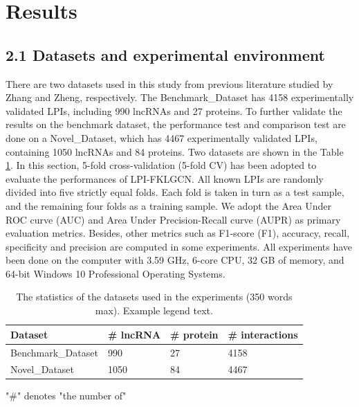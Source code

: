 \documentclass[fleqn,10pt]{wlscirep}
\begin{document}
\section*{Results}
\subsection*{2.1 Datasets and experimental environment}
There are two datasets used in this study from previous literature studied by Zhang\cite{Zhang2018} and Zheng\cite{Zheng2017a}, respectively. The Benchmark\_Dataset has 4158 experimentally validated LPIs, including 990 lncRNAs and 27 proteins. To further validate the results on the benchmark dataset, the performance test and comparison test are done on a Novel\_Dataset, which has 4467 experimentally validated LPIs, containing 1050 lncRNAs and 84 proteins. Two datasets are shown in the Table \ref{tab:datasets}. In this section, 5-fold cross-validation (5-fold CV) has been adopted to evaluate the performances of LPI-FKLGCN. All known LPIs are randomly divided into five strictly equal folds. Each fold is taken in turn as a test sample, and the remaining four folds as a training sample. We adopt the Area Under ROC curve (AUC) and Area Under Precision-Recall curve (AUPR)  as primary evaluation metrics. Besides, other metrics such as F1-score (F1), accuracy, recall, specificity and precision are computed in some experiments. All experiments have been done on the computer with 3.59 GHz, 6-core CPU, 32 GB of memory, and 64-bit Windows 10 Professional Operating Systems.
\begin{table}[ht]
\centering
\caption{\label{tab:datasets} The statistics of the datasets used in the experiments (350 words max). Example legend text.}
\begin{threeparttable}[b]
\begin{tabular}{|l|l|l|l|}
\hline
Dataset & \# lncRNA & \# protein & \# interactions \\
\hline
Benchmark_Dataset & 990 & 27 & 4158\\
\hline
Novel_Dataset & 1050 & 84 & 4467 \\
\hline
\end{tabular}
\begin{tablenotes}
     \item "\#" denotes "the number of"
     \end{tablenotes}
     \end{threeparttable}
\end{table}
\end{document}

